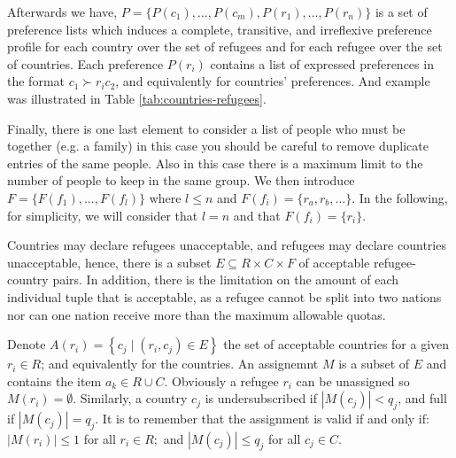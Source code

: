 \documentclass[letterpaper]{article} %
\begin{document}
Afterwards we have, \(P = \{P(c_1), \dots , P(c_m), P(r_1), \dots , P(r_n)\}\) is
a set of preference lists which induces a complete, transitive, and irreflexive preference profile for each
country over the set of refugees and for each refugee over the set of countries. 
Each preference \(P(r_i)\) contains a list of expressed preferences in the format \( c _ { 1 } \succ r _ { i } c _ { 2 } \),
and equivalently for countries' preferences.
And example was illustrated in Table \ref{tab:countries-refugees}.

Finally, there is one last element to consider a list of people who must be together (e.g. a family)
in this case you should be careful to remove duplicate entries of the same people. Also in this case there is a maximum limit to the number of people to keep in the same group.
We then introduce \(F=\{F(f_1), ..., F(f_l)\}\) where \(l\leq n\) and \(F(f_i) = \{r_a, r_b, ...\}\).
In the following, for simplicity, we will consider that \(l=n\) and that \(F(f_i)=\{r_i\}\).

Countries may declare refugees unacceptable, and refugees may declare countries unacceptable, 
hence, there is a subset \(E \subseteq R \times C \times F\) of acceptable refugee-country pairs.
In addition, there is the limitation on the amount of each individual tuple that is acceptable, as a refugee cannot be split into two nations nor can one nation receive more than the maximum allowable quotas.

Denote \( A \left( r _ { i } \right) = \left\{ c _ { j } \mid \left( r _ { i } , c _ { j } \right) \in E \right\} \)
the set of acceptable countries for a given \( r _ { i } \in R \); and equivalently for the countries.
An assignemnt \(M\) is a subset of \(E\) and contains the item \( a _ { k } \in R \cup C \). Obviously a refugee \( r _ { i } \) can be unassigned so \( M \left( r _ { i } \right) = \emptyset \).
Similarly, a country \( c _ { j } \) is
undersubscribed if \( \left| M \left( c _ { j } \right) \right| < q _ { j } \), and full if \( \left| M \left( c _ { j } \right) \right| = q _ { j } \).
It is to remember that the assignment is valid if and only if:
\( \left| M \left( r _ { i } \right) \right| \leq 1 \) for all \( r _ { i } \in R ; \) and
\( \left| M \left( c _ { j } \right) \right| \leq q _ { j } \) for all \( c _ { j } \in C  \).
\end{document}
